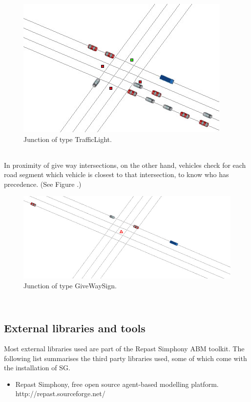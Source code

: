 \documentclass[11pt]{article}
\begin{document}
\begin{enumerate}
\begin{figure}[H]
\begin{center}
\includegraphics[scale=0.4]{traffic_light_junction}
\caption{Junction of type TrafficLight.}
\end{center}
\end{figure}

\\
In proximity of give way intersections, on the other hand, vehicles check for each road segment which vehicle is closest to that intersection, to know who has precedence. (See Figure .)
\\
\begin{figure}[H]
\begin{center}
\includegraphics[scale=0.3]{give_way_junction}
\caption{Junction of type GiveWaySign.}
\end{center}
\end{figure}
\\

\subsection{External libraries and tools}

Most external libraries used are part of the Repast Simphony ABM toolkit.
The following list summarises the third party libraries used, some of which come with the installation of SG.
\begin{itemize}\itemsep0pt
\item Repast Simphony, free open source agent-based modelling platform.
\\
http://repast.sourceforge.net/


\end{itemize}
\end{enumerate}
\end{document}
